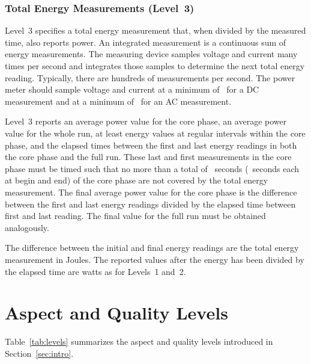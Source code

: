 \subsubsection{Total Energy Measurements (Level~3)}

\noindent
Level~3 specifies a total energy measurement that, when divided by the measured time, also reports power.
An integrated measurement is a continuous sum of energy measurements.
The measuring device samples voltage and current many times per second and integrates those samples to determine the next total energy reading.
Typically, there are hundreds of measurements per second.
The power meter should sample voltage and current at a minimum of~\SpecRateLThreeDC{} for a DC measurement and at a minimum of~\SpecRateLThreeAC{} for an AC measurement.
\wl

\noindent
Level~3 reports an average power value for the core phase, an average power value for the whole run, at least \MinMeasurementsCorePhaseLTwoThree{} energy values at regular intervals within the core phase, and the elapsed times between the first and last energy readings in both the core phase and the full run.
These last and first measurements in the core phase must be timed such that no more than a total of \MaxSecMissingLThree{}~seconds (\MaxSecMissingLThreeHalf{}~seconds each at begin and end) of the core phase are not covered by the total energy measurement.
The final average power value for the core phase is the difference between the first and last energy readings divided by the elapsed time between first and last reading.
The final value for the full run must be obtained analogously.
\wl

\noindent
The difference between the initial and final energy readings are the total energy measurement in Joules.
The reported values after the energy has been divided by the elapsed time are watts as for Levels~1 and~2.

\section{Aspect and Quality Levels}
\label{sec:AQLevels}
\noindent
Table~\ref{tab:levels} summarizes the aspect and quality levels introduced in Section~\ref{sec:intro}. 

